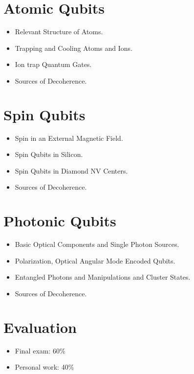 \documentclass[11pt,a4paper]{article}
\begin{document}
\section{Atomic Qubits}
\begin{itemize}[noitemsep]
    \item Relevant Structure of Atoms.
    \item Trapping and Cooling Atoms and Ions.
    \item Ion trap Quantum Gates.
    \item Sources of Decoherence.
\end{itemize}

\section{Spin Qubits}
\begin{itemize}[noitemsep]
    \item Spin in an External Magnetic Field.
    \item Spin Qubits in Silicon.
    \item Spin Qubits in Diamond NV Centers.
    \item Sources of Decoherence.
\end{itemize}

\section{Photonic Qubits}
\begin{itemize}[noitemsep]
    \item Basic Optical Components and Single Photon Sources.
    \item Polarization, Optical Angular Mode Encoded Qubits.
    \item Entangled Photons and Manipulations and Cluster States.
    \item Sources of Decoherence.
\end{itemize}

\vspace{1cm}

\section*{Evaluation}
\begin{itemize}[label=--]
    \item Final exam: 60\%
    \item Personal work: 40\%
\end{itemize}
\end{document}
